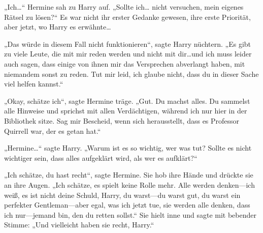 „Ich…“ Hermine sah zu Harry auf. „Sollte ich… nicht versuchen, mein eigenes Rätsel zu lösen?“ Es war nicht ihr erster Gedanke gewesen, ihre erste Priorität, aber jetzt, wo Harry es erwähnte…

„Das würde in diesem Fall nicht funktionieren“, sagte Harry nüchtern. „Es gibt zu viele Leute, die mit mir reden werden und nicht mit dir…und ich muss leider auch sagen, dass einige von ihnen mir das Versprechen abverlangt haben, mit niemandem sonst zu reden. Tut mir leid, ich glaube nicht, dass du in dieser Sache viel helfen kannst.“

„Okay, schätze ich“, sagte Hermine träge. „Gut. Du machst alles. Du sammelst alle Hinweise und sprichst mit allen Verdächtigen, während ich nur hier in der Bibliothek sitze. Sag mir Bescheid, wenn sich herausstellt, dass es Professor Quirrell war, der es getan hat.“

„Hermine…“ sagte Harry. „Warum ist es so wichtig, wer was tut? Sollte es nicht wichtiger sein, dass alles aufgeklärt wird, als wer es aufklärt?“

„Ich schätze, du hast recht“, sagte Hermine. Sie hob ihre Hände und drückte sie an ihre Augen. „Ich schätze, es spielt keine Rolle mehr. Alle werden denken—ich weiß, es ist nicht deine Schuld, Harry, du warst—du warst gut, du warst ein perfekter Gentleman—aber egal, was ich jetzt tue, sie werden alle denken, dass ich nur—jemand bin, den du retten sollst.“
Sie hielt inne und sagte mit bebender Stimme: „Und vielleicht haben sie recht, Harry.“

